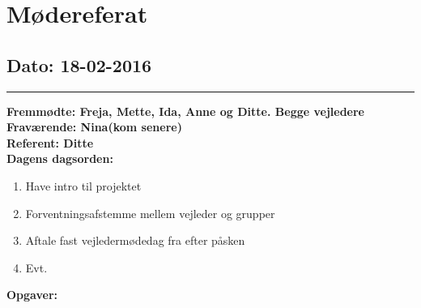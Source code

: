 \chapter{Mødereferat}

\section{Dato: 18-02-2016}
\hrule
\textbf{Fremmødte: Freja, Mette, Ida, Anne og Ditte. Begge vejledere} \\
\textbf{Fraværende: Nina(kom senere)} \\
\textbf{Referent: Ditte } \\
\textbf{Dagens dagsorden: }
\begin{enumerate}
	\item Have intro til projektet
	\item Forventningsafstemme mellem vejleder og grupper
	\item Aftale fast vejledermødedag fra efter påsken
	\item Evt. 
\end{enumerate}

\textbf{Opgaver:} \newline

